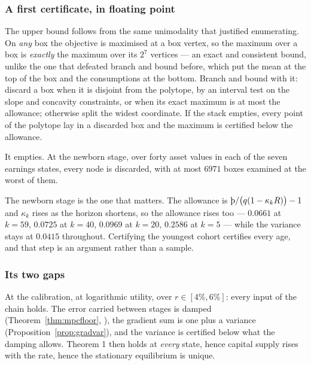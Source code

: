 \subsubsection*{A first certificate, in floating point}

The upper bound follows from the same unimodality that justified enumerating. On \emph{any} box the
objective is maximised at a box vertex, so the maximum over a box is \emph{exactly} the maximum over
its $2^{7}$ vertices --- an exact and consistent bound, unlike the one that defeated branch and bound
before, which put the mean at the top of the box and the consumptions at the bottom. Branch and bound
with it: discard a box when it is disjoint from the polytope, by an interval test on the slope and
concavity constraints, or when its exact maximum is at most the allowance; otherwise split the widest
coordinate. If the stack empties, every point of the polytope lay in a discarded box and the maximum is
certified below the allowance.

It empties. At the newborn stage, over forty asset values in each of the seven earnings states, every
node is discarded, with at most $6971$ boxes examined at the worst of them.

The newborn stage is the one that matters. The allowance is $\Thorn/\bigl(q(1-\kappa_kR)\bigr)-1$ and
$\kappa_k$ rises as the horizon shortens, so the allowance rises too --- $0.0661$ at $k=59$, $0.0725$
at $k=40$, $0.0969$ at $k=20$, $0.2586$ at $k=5$ --- while the variance stays at $0.0415$ throughout.
Certifying the youngest cohort certifies every age, and that step is an argument rather than a sample.

\subsubsection*{Its two gaps}

At the calibration, at logarithmic utility, over $r\in[4\%,6\%]$: every input of the chain holds. The
error carried between stages is damped (Theorem~\ref{thm:mpcfloor}, ), the
gradient sum is one plus a variance (Proposition~\ref{prop:gradvar}), and the variance is certified
below what the damping allows. Theorem 1 then holds at \emph{every} state, hence capital supply rises
with the rate, hence the stationary equilibrium is unique.

